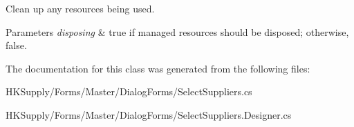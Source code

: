 Clean up any resources being used. 


\begin{DoxyParams}{Parameters}
{\em disposing} & true if managed resources should be disposed; otherwise, false.\\
\hline
\end{DoxyParams}


The documentation for this class was generated from the following files\+:\begin{DoxyCompactItemize}
\item 
H\+K\+Supply/\+Forms/\+Master/\+Dialog\+Forms/Select\+Suppliers.\+cs\item 
H\+K\+Supply/\+Forms/\+Master/\+Dialog\+Forms/Select\+Suppliers.\+Designer.\+cs\end{DoxyCompactItemize}
